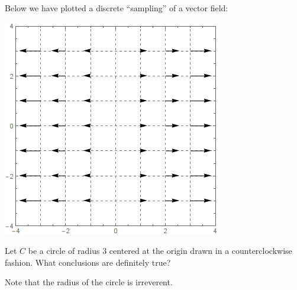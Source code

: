 \documentclass{ximera}
\begin{document}
\begin{exercise}
  Below we have plotted a discrete ``sampling'' of a vector field:
  \begin{image}
    \includegraphics{field5.png}
  \end{image}
  Let $C$ be a circle of radius $3$ centered at the origin drawn in a
  counterclockwise fashion.  What conclusions are definitely true?
  \begin{selectAll}
  \end{selectAll}
  \begin{hint}
    Note that the radius of the circle is irreverent. 
  \end{hint}
\end{exercise}
\end{document}

